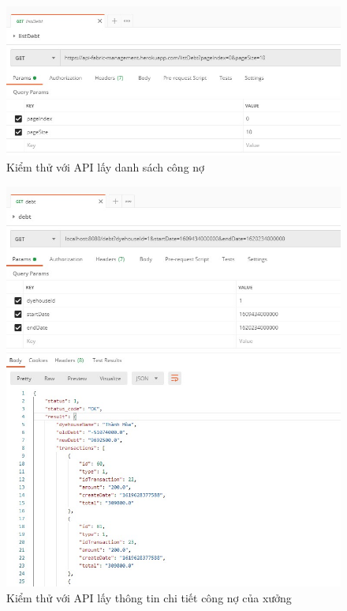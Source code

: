 \begin{figure}[H]
    \begin{center}
        \includegraphics[width=12cm]{Image/API/10_listDebt.jpg}
        \caption{Kiểm thử với API lấy danh sách công nợ}
        \label{listDebt}
    \end{center}
\end{figure}
\begin{figure}[H]
    \begin{center}
        \includegraphics[width=12cm]{Image/API/10b_getDebt.jpg}
        \caption{Kiểm thử với API lấy thông tin chi tiết công nợ của xưởng}
        \label{getDebt}
    \end{center}
\end{figure}
